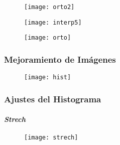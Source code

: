 \documentclass[14pt]{beamer}
\begin{document}
\begin{frame}
  \begin{figure}
    \centering
    \qquad
    \label{fig:1}
  \end{figure}
  \begin{figure}
    \centering
    \qquad
    \label{fig:2}
  \end{figure}
\end{frame}
\begin{frame}
\scriptsize{}
  \begin{figure}
    \centering
    \texttt{[image: orto2]}
  \end{figure}
\end{frame}
\begin{frame}
\scriptsize{}
  \begin{figure}
    \centering
    \texttt{[image: interp5]}
  \end{figure}
\end{frame}
\begin{frame}
\scriptsize{}
  \begin{figure}
    \centering
    \texttt{[image: orto]}
  \end{figure}
\end{frame}
\begin{frame}
\frametitle{Mejoramiento de Imágenes}
  \begin{figure}
    \centering
    \texttt{[image: hist]}
  \end{figure}
\tiny{}
\end{frame}
\begin{frame}
\frametitle{Ajustes del Histograma}
\framesubtitle{\emph{Strech}}
  \begin{figure}
    \centering
    \texttt{[image: strech]}
  \end{figure}
\tiny{}
\end{frame}
\end{document}
